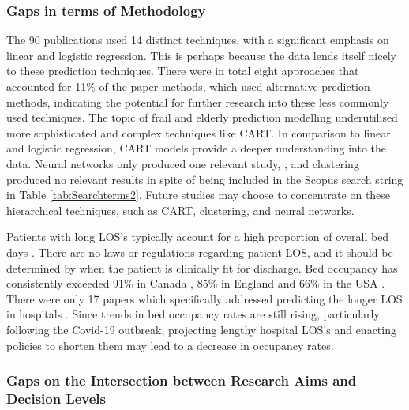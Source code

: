 \documentclass[../thesis.tex]{subfiles}
\begin{document}
\subsubsection{Gaps in terms of Methodology}

The 90 publications used 14 distinct techniques, with a significant emphasis on linear and logistic regression. This is perhaps because the data lends itself nicely to these prediction techniques. There were in total eight approaches that accounted for 11\% of the paper methods, which used alternative prediction methods, indicating the potential for further research into these less commonly used techniques. The topic of frail and elderly prediction modelling underutilised more sophisticated and complex techniques like CART. In comparison to linear and logistic regression, CART models provide a deeper understanding into the data. Neural networks only produced one relevant study, \cite{Launay2015}, and clustering produced no relevant results in spite of being included in the Scopus search string in Table \ref{tab:Searchterms2}. Future studies may choose to concentrate on these hierarchical techniques, such as CART, clustering, and neural networks.

Patients with long LOS's typically account for a high proportion of overall bed days \cite{Quinn2007}. There are no laws or regulations regarding patient LOS, and it should be determined by when the patient is clinically fit for discharge. Bed occupancy has consistently exceeded 91\% in Canada \cite{OECD2023}, 85\% in England \cite{BMA2023} and 66\% in the USA \cite{CDCP2017}. There were only 17 papers which specifically addressed predicting the longer LOS in hospitals \cite{Abe,Beauchet2013,Beauchet2018,Bo2015,Cacciatore2012,Cai2009,Chen2020,Curiati2020,Greene2001,Kirfel2021,Lang2009,Launay2014,Launay2015,Launay2018,MacDonald2010,Marin2021,Motohashi2013,Toh2017}. Since trends in bed occupancy rates are still rising, particularly following the Covid-19 outbreak, projecting lengthy hospital LOS's and enacting policies to shorten them may lead to a decrease in occupancy rates.

\subsubsection{Gaps on the Intersection between Research Aims and Decision Levels}
\end{document}
